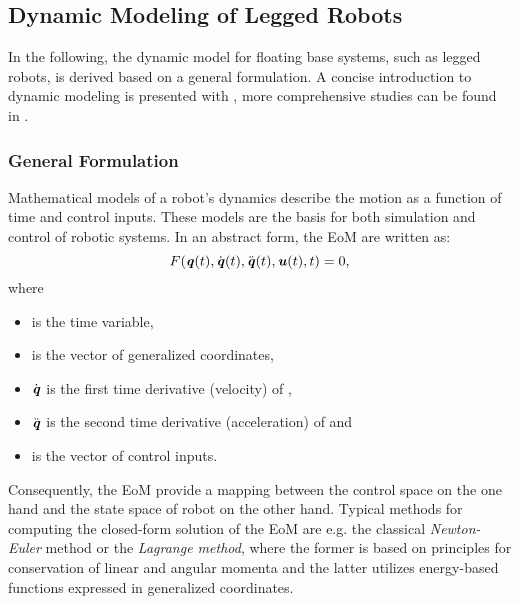\subsection{Dynamic Modeling of Legged Robots}\label{subsec:DynamicModeling}
In the following, the dynamic model for floating base systems, such as legged robots, is derived based on a general formulation. A concise introduction to dynamic modeling is presented with \cite{scaronTeaching}, more comprehensive studies can be found in \cite{roboticSystemsLab2017, featherstone2014rigid}.
\subsubsection{General Formulation}
Mathematical models of a robot's dynamics describe the motion as a function of time and control inputs. These models are the basis for both simulation and control of robotic systems. In an abstract form, the \gls{EoM} are written as: 
\begin{equation} \label{eqn:EoMGeneral}
F(\bm{\mathit{q}}(t),\dot{\bm{\mathit{q}}}(t),\ddot{\bm{\mathit{q}}}(t),\bm{\mathit{u}}(t),t)=0,
\end{equation}
where 
\begin{itemize}
\item {} is the time variable, 
\item {} is the vector of generalized coordinates,
\item $\dot{\bm{\mathit{q}}}$ is the first time derivative (velocity) of , 
\item $\ddot{\bm{\mathit{q}}}$ is the second time derivative (acceleration) of  and
\item {} is the vector of control inputs. 
\end{itemize}
Consequently, the \gls{EoM} provide a mapping between the control space on the one hand and the state space of robot on the other hand. Typical methods for computing the closed-form solution of the \gls{EoM} are e.g. the classical \textit{Newton-Euler} method or the \textit{Lagrange method}, where the former is based on principles for conservation of linear and angular momenta and the latter utilizes energy-based functions expressed in generalized coordinates. 
